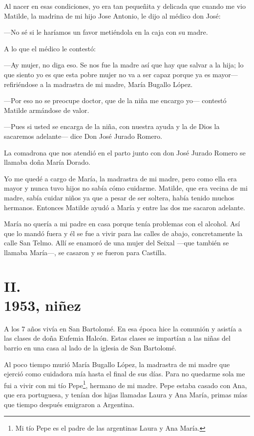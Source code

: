 \documentclass[12pt,a5paper]{book}
\begin{document}
Al nacer en esas condiciones, yo era tan pequeñita y delicada que cuando me vio Matilde, la madrina de mi hijo Jose Antonio, le dijo al médico don José:

---No sé si le haríamos un favor metiéndola en la caja con su madre.

A lo que el médico le contestó:

---Ay mujer, no diga eso. Se nos fue la madre así que hay que salvar a la hija; lo que siento yo es que esta pobre mujer no va a ser capaz porque ya es mayor--- refiriéndose a la madrastra de mi madre, María Bugallo López.

---Por eso no se preocupe doctor, que de la niña me encargo yo--- contestó Matilde armándose de valor.

---Pues si usted se encarga de la niña, con nuestra ayuda y la de Dios la sacaremos adelante--- dice Don José Jurado Romero.

La comadrona que nos atendió en el parto junto con don José Jurado Romero se llamaba doña María Dorado.

Yo me quedé a cargo de María, la madrastra de mi madre, pero como ella era mayor y nunca tuvo hijos no sabía cómo cuidarme. Matilde, que era vecina de mi madre, sabía cuidar niños ya que a pesar de ser soltera, había tenido muchos hermanos. Entonces Matilde ayudó a María y entre las dos me sacaron adelante.

María no quería a mi padre en casa porque tenía problemas con el alcohol. Así que lo mandó fuera y él se fue a vivir para las calles de abajo, concretamente la calle San Telmo. Allí se enamoró de una mujer del Seixal ---que también se llamaba María---, se casaron y se fueron para Castilla.

\section*{II.\\1953, niñez}

A los 7 años vivía en San Bartolomé. En esa época hice la comunión y asistía a las clases de doña Eufemia Halcón. Estas clases se impartían a las niñas del barrio en una casa al lado de la iglesia de San Bartolomé.

Al poco tiempo murió María Bugallo López, la madrastra de mi madre que ejerció como cuidadora mía hasta el final de sus días. Para no quedarme sola me fui a vivir con mi tío Pepe\footnote{Mi tío Pepe es el padre de las argentinas Laura y Ana María.}, hermano de mi madre. Pepe estaba casado con Ana, que era portuguesa, y tenían dos hijas llamadas Laura y Ana María, primas mías que tiempo después emigraron a Argentina. 
\end{document}
